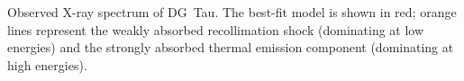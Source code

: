 \label{fig:fit}
Observed X-ray spectrum of DG~Tau. The best-fit model is shown in red; orange lines represent the weakly absorbed recollimation shock (dominating at low energies) and the strongly absorbed thermal emission component (dominating at high energies).